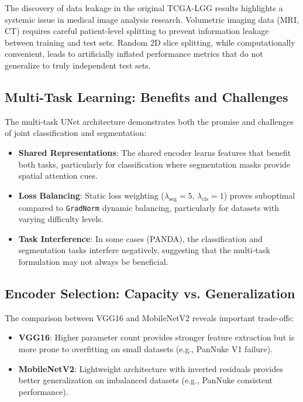 \documentclass[11pt,a4paper,twoside]{report}
\newcommand{\dataset}[1]{\textsc{#1}}
\newcommand{\model}[1]{\texttt{#1}}
\begin{document}
The discovery of data leakage in the original \dataset{TCGA}-LGG results highlights a systemic issue in medical image analysis research. Volumetric imaging data (MRI, CT) requires careful patient-level splitting to prevent information leakage between training and test sets. Random 2D slice splitting, while computationally convenient, leads to artificially inflated performance metrics that do not generalize to truly independent test sets.

\subsection{Multi-Task Learning: Benefits and Challenges}

The multi-task UNet architecture demonstrates both the promise and challenges of joint classification and segmentation:

\begin{itemize}
    \item \textbf{Shared Representations}: The shared encoder learns features that benefit both tasks, particularly for classification where segmentation masks provide spatial attention cues.
    \item \textbf{Loss Balancing}: Static loss weighting ($\lambda_{\text{seg}}=5$, $\lambda_{\text{cls}}=1$) proves suboptimal compared to \model{GradNorm} dynamic balancing, particularly for datasets with varying difficulty levels.
    \item \textbf{Task Interference}: In some cases (PANDA), the classification and segmentation tasks interfere negatively, suggesting that the multi-task formulation may not always be beneficial.
\end{itemize}

\subsection{Encoder Selection: Capacity vs. Generalization}

The comparison between VGG16 and MobileNetV2 reveals important trade-offs:

\begin{itemize}
    \item \textbf{VGG16}: Higher parameter count provides stronger feature extraction but is more prone to overfitting on small datasets (e.g., PanNuke V1 failure).
    \item \textbf{MobileNetV2}: Lightweight architecture with inverted residuals provides better generalization on imbalanced datasets (e.g., PanNuke consistent performance).
\end{itemize}
\end{document}
